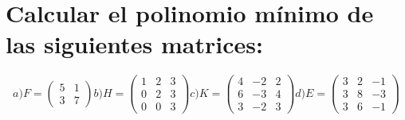 \section{Calcular el polinomio mínimo de las siguientes matrices:}
\[a)F = \begin{pmatrix}
	5 & 1 \\
	3 & 7 \end{pmatrix}
b)H = \begin{pmatrix}
	1 & 2 & 3 \\
	0 & 2 & 3 \\
	0 & 0 & 3\end{pmatrix}
c)K = \begin{pmatrix}
	4 & -2 & 2 \\
	6 & -3 & 4 \\
	3 & -2 & 3\end{pmatrix}
d)E = \begin{pmatrix}
	3 & 2 & -1 \\
	3 & 8 & -3 \\
	3 & 6 & -1\end{pmatrix}	\]
